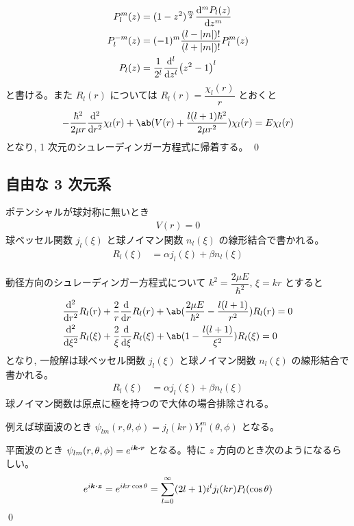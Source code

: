 \documentclass[uplatex,dvipdfmx,a4paper,11pt]{jlreq}
\makeatletter
\numberwithin{equation}{section}
\theoremstyle{definition}
\renewenvironment{proof}[1][\proofname]{\par
  \normalfont
  \topsep6\p@\@plus6\p@ \trivlist
  \item[\hskip\labelsep{\bfseries #1}\@addpunct{\bfseries}]\ignorespaces\quad\par
}{%
  \qed\endtrivlist\@endpefalse
}
\renewcommand\proofname{証明}
\makeatother
\begin{document}
\begin{proof}
\begin{align}
    P_l^m(z)            & = (1 - z^2)^{\frac{m}{2}}\dv[m]{P_l(z)}{z}                                                              \\
    P_l^{-m}(z)         & = (-1)^m\frac{(l - |m|)!}{(l + |m|)!}P_l^m(z)                                                           \\
    P_l(z)              & = \frac{1}{2^l}\dv[l]{z}(z^2 - 1)^l
  \end{align}
  と書ける。また $R_l(r)$ については $R_l(r) = \dfrac{\chi_l(r)}{r}$ とおくと
  \begin{align}
    - \frac{\hbar^2}{2\mu r}\dv[2]{r}\chi_l(r) + \ab(V(r) + \frac{l(l+1)\hbar^2}{2\mu r^2})\chi_l(r) = E\chi_l(r)
  \end{align}
  となり, 1 次元のシュレーディンガー方程式に帰着する。
\end{proof}



\subsection{自由な 3 次元系}
\begin{proposition}
  ポテンシャルが球対称に無いとき
  \begin{align}
    V(r) = 0
  \end{align}
  球ベッセル関数 $j_l(\xi)$ と球ノイマン関数 $n_l(\xi)$ の線形結合で書かれる。
  \begin{align}
    R_l(\xi) & = \alpha j_l(\xi) + \beta n_l(\xi)
  \end{align}
\end{proposition}
\begin{proof}
  動径方向のシュレーディンガー方程式について $k^2 = \dfrac{2\mu E}{\hbar^2}$, $\xi = kr$ とすると
  \begin{align}
     & \dv[2]{r}R_l(r) + \frac{2}{r}\dv{r}R_l(r) + \ab(\frac{2\mu E}{\hbar^2} - \frac{l(l+1)}{r^2})R_l(r) = 0 \\
     & \dv[2]{\xi}R_l(\xi) + \frac{2}{\xi}\dv{\xi}R_l(\xi) + \ab(1 - \frac{l(l+1)}{\xi^2})R_l(\xi) = 0
  \end{align}
  となり, 一般解は球ベッセル関数 $j_l(\xi)$ と球ノイマン関数 $n_l(\xi)$ の線形結合で書かれる。
  \begin{align}
    R_l(\xi) & = \alpha j_l(\xi) + \beta n_l(\xi)
  \end{align}
  球ノイマン関数は原点に極を持つので大体の場合排除される。

  例えば球面波のとき $\psi_{lm}(r, \theta, \phi) = j_l(kr)Y_l^m(\theta,\phi)$ となる。

  平面波のとき $\psi_{lm}(r, \theta, \phi) = e^{i\bm{k}\vdot\bm{r}}$ となる。特に $z$ 方向のとき次のようになるらしい。
  \begin{align}
    e^{i\bm{k}\vdot\bm{z}} = e^{ikr\cos\theta} = \sum_{l = 0}^\infty (2l + 1)i^lj_l(kr)P_l(\cos\theta)
  \end{align}
\end{proof}
\end{document}
